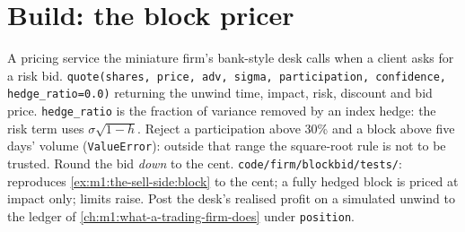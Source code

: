 \begin{omfigure}

\end{omfigure}

\section{Build: the block pricer}\label{bld:m1:the-sell-side:blockbid}

\begin{build}
 A pricing service the miniature firm's bank-style desk
calls when a client asks for a risk bid.
 \texttt{quote(shares, price, adv, sigma, participation,
confidence, hedge\_ratio=0.0)} returning the unwind time, impact, risk,
discount and bid price. \texttt{hedge\_ratio} is the fraction of variance
removed by an index hedge: the risk term uses $\sigma\sqrt{1-h}$.
 Reject a participation above 30\% and a block above five
days' volume (\texttt{ValueError}): outside that range the square-root rule
is not to be trusted. Round the bid \emph{down} to the cent.
 \texttt{code/firm/blockbid/tests/}: reproduces
\cref{ex:m1:the-sell-side:block} to the cent; a fully hedged block is priced
at impact only; limits raise.
 Post the desk's realised profit on a simulated unwind to
the ledger of \cref{ch:m1:what-a-trading-firm-does} under \texttt{position}.
\end{build}


